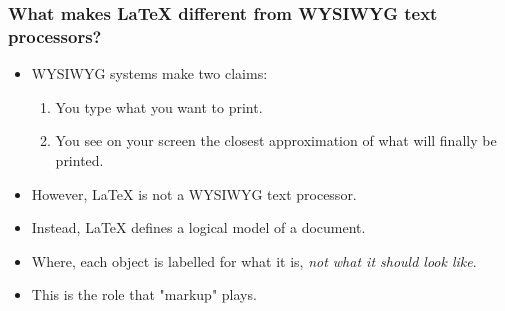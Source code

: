 \documentclass[]{beamer}
\begin{document}
	\begin{frame}
		\frametitle{What makes {\LaTeX} different from WYSIWYG text processors?}
		\begin{itemize}[<+->]
			\item WYSIWYG systems make two claims:
				\begin{enumerate}
					\item You type what you want to print.
					\item You see on your screen the closest approximation of what will finally be printed.
				\end{enumerate}
			\item However, {\LaTeX} is not a WYSIWYG text processor.
			\item Instead, {\LaTeX} defines a logical model of a document.
			\item Where, each object is labelled for what it is, \emph{not what it should look like}.
			\item This is the role that "markup" plays.
		\end{itemize}
		
	\end{frame}
\end{document}
